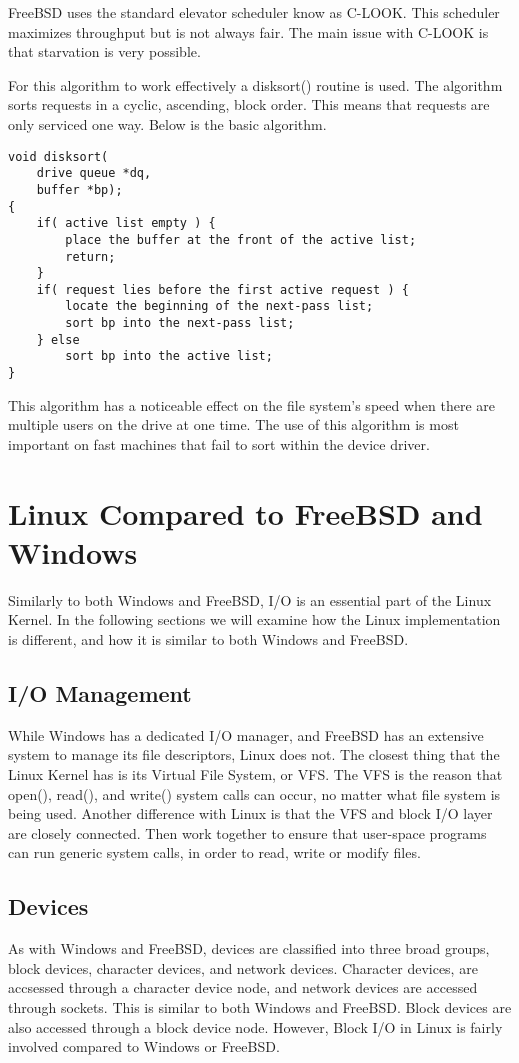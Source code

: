 \documentclass[letterpaper,10pt,titlepage,draftclsnofoot,onecolumn]{IEEEtran}
\begin{document}
FreeBSD uses the standard elevator scheduler know as C-LOOK. This scheduler maximizes throughput but is not always fair. The main issue with C-LOOK is that starvation is very possible. \cite{freebsd}

For this algorithm to work effectively a disksort() routine is used. The algorithm sorts requests in a cyclic, ascending, block order. This means that requests are only serviced one way. Below is the basic algorithm.

\begin{lstlisting}
void disksort(
	drive queue *dq,
	buffer *bp);
{
	if( active list empty ) {
		place the buffer at the front of the active list;
		return;
	}
	if( request lies before the first active request ) {
		locate the beginning of the next-pass list;
		sort bp into the next-pass list;
	} else
		sort bp into the active list;
}
\end{lstlisting} \cite{freebsd}

This algorithm has a noticeable effect on the file system's speed when there are multiple users on the drive at one time. The use of this algorithm is most important on fast machines that fail to sort within the device driver. 

\section{Linux Compared to FreeBSD and Windows}
Similarly to both Windows and FreeBSD, I/O is an essential part of the Linux Kernel. In the following sections we will examine how the Linux implementation is different, and how it is similar to both Windows and FreeBSD. 

\subsection{I/O Management}
While Windows has a dedicated I/O manager, and FreeBSD has an extensive system to manage its file descriptors, Linux does not. The closest thing that the Linux Kernel has is its Virtual File System, or VFS. The VFS is the reason that open(), read(), and write() system calls can occur, no matter what file system is being used. Another difference with Linux is that the VFS and block I/O layer are closely connected. Then work together to ensure that user-space programs can run generic system calls, in order to read, write or modify files. \cite{linux} 

\subsection{Devices}
As with Windows and FreeBSD, devices are classified into three broad groups, block devices, character devices, and network devices. Character devices, are accsessed through a character device node, and network devices are accessed through sockets. This is similar to both Windows and FreeBSD. Block devices are also accessed through a block device node. However, Block I/O in Linux is fairly involved compared to Windows or FreeBSD. 
\end{document}
